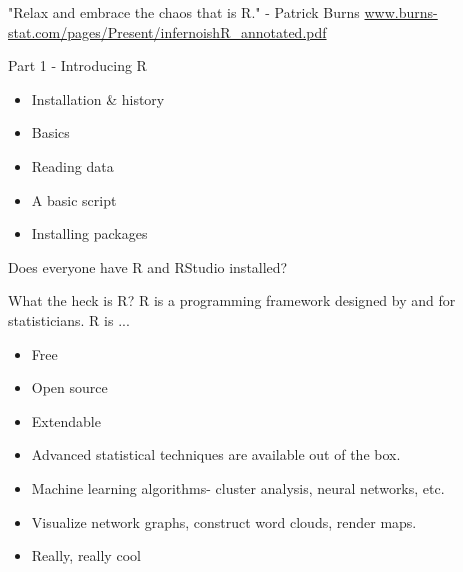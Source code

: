 \documentclass[xcolor=dvipsnames]{beamer}
\begin{document}
\begin{frame}
  "Relax and embrace the chaos that is R."
  \vspace{\baselineskip}
  \vspace{\baselineskip}
  - Patrick Burns
  \vspace{\baselineskip}
  \vspace{\baselineskip}
  \url{www.burns-stat.com/pages/Present/infernoishR_annotated.pdf}
\end{frame}

\begin{frame}{Part 1 - Introducing R}
  \begin{itemize}
    \item Installation \& history
    \item Basics
    \item Reading data
    \item A basic script
    \item Installing packages
  \end{itemize}
\end{frame}

\begin{frame}
Does everyone have R and RStudio installed?
\end{frame}

\begin{frame}{What the heck is R?}
  R is a programming framework designed by and for statisticians. R is ... 
  \begin{itemize}
    \item Free %
    \item Open source %
    \item Extendable %
    \item Advanced statistical techniques are available out of the box. 
    \item Machine learning algorithms- cluster analysis, neural networks, etc.%
    \item Visualize network graphs, construct word clouds, render maps. %
    \item Really, really cool 
  \end{itemize}
\end{frame}
\end{document}
